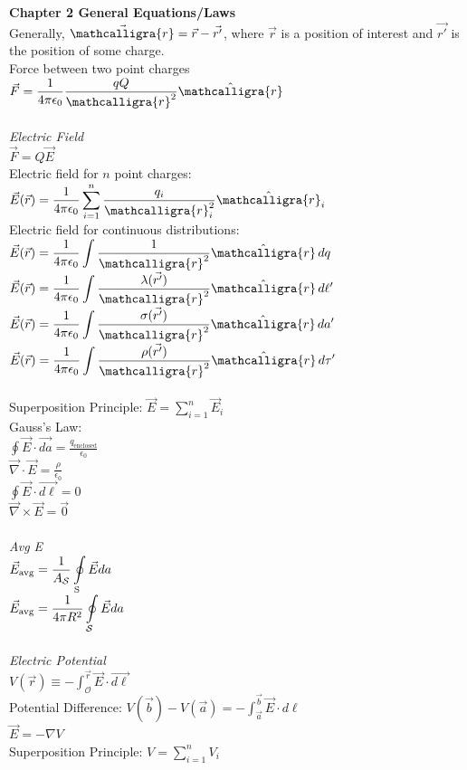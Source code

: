 \documentclass[12pt]{article}
\newcommand{\ds}{\displaystyle}
\newcommand{\scripty}[1]{\ensuremath{\mathcalligra{#1}}}
\begin{document}
\begin{flushleft}
\textbf{Chapter 2 General Equations/Laws}\\
Generally, $\vec{\scripty{r}}=\vec{r}-\vec{r'}$, where $\vec{r}$ is a position of interest and $\vec{r'}$ is the position of some charge.\\
Force between two point charges $\ds\vec{F}=\frac{1}{4\pi\epsilon_0}\frac{qQ}{\scripty{r}^2}\hat{\scripty{r}}$\\~\\

\textit{Electric Field}\\
$\vec{F}=Q\vec{E}$\\
Electric field for $n$ point charges: $\ds\vec{E}(\vec{r})=\frac{1}{4\pi\epsilon_0}\sum_{i=1}^n\frac{q_i}{\scripty{r}_i^2}\hat{\scripty{r}}_i$\\
Electric field for continuous distributions:\\
$\ds\vec{E}(\vec{r})=\frac{1}{4\pi\epsilon_0}\int\frac{1}{\scripty{r}^2}\hat{\scripty{r}}\,dq$\\
$\ds\vec{E}(\vec{r})=\frac{1}{4\pi\epsilon_0}\int\frac{\lambda(\vec{r'})}{\scripty{r}^2}\hat{\scripty{r}}\,d\ell'$\\
$\ds\vec{E}(\vec{r})=\frac{1}{4\pi\epsilon_0}\int\frac{\sigma(\vec{r'})}{\scripty{r}^2}\hat{\scripty{r}}\,da'$\\
$\ds\vec{E}(\vec{r})=\frac{1}{4\pi\epsilon_0}\int\frac{\rho(\vec{r'})}{\scripty{r}^2}\hat{\scripty{r}}\,d\tau'$\\~\\

Superposition Principle: $\ds\vec{E}=\sum_{i=1}^n\vec{E}_i$\\
Gauss's Law:\\
$\ds\oint\vec{E}\cdot\vec{da}=\frac{q_{\text{enclosed}}}{\epsilon_0}$\\
$\ds\vec{\nabla}\cdot\vec{E}=\frac{\rho}{\epsilon_0}$\\
$\ds\oint\vec{E}\cdot\vec{d\ell}=0$\\
$\ds\vec{\nabla}\times\vec{E}=\vec{0}$\\~\\
\textit{Avg E}\\
$\ds\vec{E}_{\text{avg}}=\frac{1}{A_\mathcal{S}}\oint\displaylimits_{\text{S}}\vec{E}da$\\
$\ds\vec{E}_{\text{avg}}=\frac{1}{4\pi R^2}\oint\displaylimits_{\mathcal{S}}\vec{E}da$\\~\\

\textit{Electric Potential}\\
$\ds V(\vec{r})\equiv-\int_{\mathcal{O}}^{\vec{r}}\vec{E}\cdot \vec{d\ell}$\\
Potential Difference: $\ds V(\vec{b})-V(\vec{a})=-\int_{\vec{a}}^{\vec{b}}\vec{E}\cdot d\ell$\\
$\vec{E}=-\nabla V$\\
Superposition Principle: $\ds V=\sum_{i=1}^nV_i$\\~\\


\end{flushleft}
\end{document}
